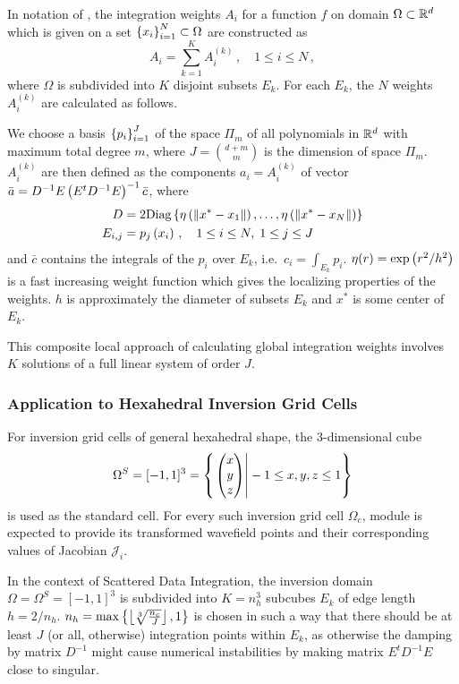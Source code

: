 In notation of \cite{Levin99}{}, the integration weights $A_i$ for a function $f$ on domain $\Omega\subset\mathbb{R}^d$ 
which is given on a set $\left\{ x_i \right\}_{i=1}^N\subset\Omega$ are constructed as
\[
A_i = \sum_{k=1}^K A_i^{(k)} \,,\quad 1 \le i \le N \, , 
\]
where $\Omega$ is subdivided into $K$ disjoint subsets $E_k$. For each $E_k$, the $N$ weights $A_i^{(k)}$ are 
calculated as follows.

We choose a basis $\left\{ p_i \right\}_{i=1}^J$ of the space $\Pi_m$ of all polynomials in $\mathbb{R}^d$ with maximum total 
degree $m$, where $J = \binom{d+m}{m}$ is the dimension of space $\Pi_m$. 
$A_i^{(k)}$ are then defined as the components $a_i = A_i^{(k)}$ of vector $\bar{a} = 
D^{-1}E\left( E^tD^{-1}E \right)^{-1}\bar{c}$, where
\begin{align*}
  D &= 2\text{Diag}\left\{ \eta\left( \|x^\ast-x_1\| \right),\dots,\eta\left( \|x^\ast-x_N\| \right) \right\}\\
  E_{i,j} &= p_j\left( x_i \right)\,,\quad 1\le i\le N,\; 1\le j\le J
\end{align*}
and $\bar{c}$ contains the integrals of the $p_i$ over $E_k$, i.e.~$c_i = \int_{E_k} p_i$. $\eta(r) = 
\exp\left( r^2/h^2 \right)$ is a fast increasing weight function which gives the localizing properties of the weights. 
$h$ is approximately the diameter of subsets $E_k$ and $x^\ast$ is some center of $E_k$.

This composite local approach of calculating global integration weights involves $K$ solutions of a full 
linear system of order $J$. 
%
\subsubsection{Application to Hexahedral Inversion Grid Cells}
%
For inversion grid cells of general hexahedral shape, the 3-dimensional cube 
\[\Omega^S = [-1,1]^3 = \left\{ \left. \begin{pmatrix} x \\ y \\ z \end{pmatrix} \right| -1 \le x,y,z \le 1 \right\}\]
is used as the standard cell. For every such inversion grid cell $\Omega_c$, module  
is expected to provide its transformed wavefield points \wpS and their corresponding values of Jacobian 
$\mathcal{J}_i$.

In the context of Scattered Data Integration, the inversion domain $\Omega=\Omega^S=[-1,1]^3$ is subdivided into
$K = n_h^3$ subcubes $E_k$ of edge length $h=2/n_h$. $n_h=\max\left\{ \left\lfloor\sqrt[3]{\frac{n_c}{J}}\right\rfloor,1 \right\}$ 
is chosen in such a way that there should be at least $J$ (or all, otherwise) integration points within $E_k$, as 
otherwise the damping by matrix $D^{-1}$ might cause numerical instabilities by making matrix $E^tD^{-1}E$ close 
to singular. 

